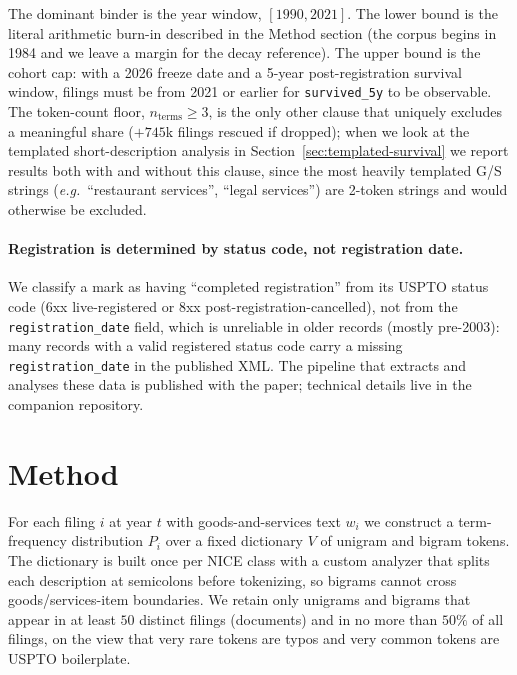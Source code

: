 \documentclass[11pt]{article}
\begin{document}
The dominant binder is the year window, $[1990, 2021]$. The lower
bound is the literal arithmetic burn-in described in the Method
section (the corpus begins in 1984 and we leave a margin for the
decay reference). The upper bound is the cohort cap: with a 2026
freeze date and a 5-year post-registration survival window, filings
must be from 2021 or earlier for \texttt{survived\_5y} to be
observable. The token-count floor, $n_{\text{terms}} \geq 3$, is the
only other clause that uniquely excludes a meaningful share ($+745$k
filings rescued if dropped); when we look at the templated
short-description analysis in Section~\ref{sec:templated-survival} we
report results both with and without this clause, since the most
heavily templated G/S strings (\textit{e.g.}~``restaurant services'',
``legal services'') are 2-token strings and would otherwise be
excluded.

\paragraph{Registration is determined by status code, not registration
date.} We classify a mark as having ``completed registration'' from its
USPTO status code (6xx live-registered or 8xx post-registration-cancelled),
not from the \texttt{registration\_date} field, which is unreliable in
older records (mostly pre-2003): many records with a valid registered
status code carry a missing \texttt{registration\_date} in the
published XML. The pipeline that extracts and analyses these data is
published with the paper; technical details live in the companion
repository.

\section{Method}

For each filing $i$ at year $t$ with goods-and-services text $w_i$ we
construct a term-frequency distribution $P_i$ over a fixed dictionary $V$
of unigram and bigram tokens. The dictionary is built once per NICE class
with a custom analyzer that splits each description at semicolons before
tokenizing, so bigrams cannot cross goods/services-item boundaries. We
retain only unigrams and bigrams that appear in at least $50$ distinct
filings (documents) and in no more than $50\%$ of all filings, on the
view that very rare tokens are typos and very common tokens are USPTO
boilerplate.
\end{document}
